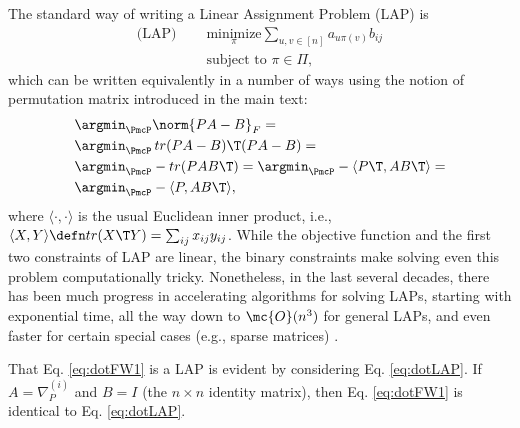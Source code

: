 \documentclass[11pt]{article}
\begin{document}
The standard way of writing a Linear Assignment Problem (LAP) is
\begin{subequations} \label{eq:LAP}
\begin{align}
	 \text{(LAP) }\quad  &\underset{\pi}{\text{minimize}} \sum_{u,v \in [n]} a_{u \pi(v)} b_{ij} \\
	&\text{subject to } \pi \in \Pi,
\end{align}
\end{subequations}
which can be written equivalently in a number of ways using the notion of permutation matrix introduced in the main text:
\begin{subequations} \label{eq:LAP2}
\begin{align}
	&\argmin_{\PmcP} \norm{PA - B}_F =\\
	&\argmin_{\PmcP} \, tr(PA-B)\T (PA-B)=\\ 
	&\argmin_{\PmcP}  -tr (P AB\T) = \argmin_{\PmcP}  -\langle P\T, AB\T \rangle = \label{eq:2c} \\
	&\argmin_{\PmcP}  -\langle P, AB\T \rangle, \label{eq:dotLAP}
\end{align}
\end{subequations}
where $\langle \cdot,\cdot \rangle$ %
is the usual Euclidean inner product, i.e., $\langle X,Y\rangle \defn tr(X\T Y)= \sum_{ij} x_{ij} y_{ij}$.
While the objective function and the first two constraints of LAP are linear, the binary constraints make solving even this problem computationally tricky.  Nonetheless, in the last several decades, there has been much progress in accelerating algorithms for solving LAPs, starting with exponential time, all the way down to $\mc{O}(n^3)$ for general LAPs, and even faster for certain special cases (e.g., sparse matrices) \cite{Jonker1987, Burkard2009}.

That Eq. \eqref{eq:dotFW1} is a LAP is evident by considering Eq. \eqref{eq:dotLAP}.  If $A=\nabla_P^{(i)}$ and $B=I$ (the $n\times n$ identity matrix), then Eq. \eqref{eq:dotFW1} is identical to Eq. \eqref{eq:dotLAP}.
\end{document}
